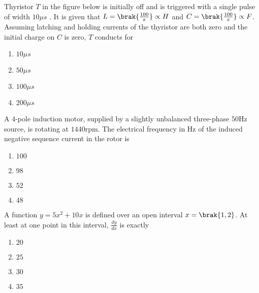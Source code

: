 \item{
Thyristor $T$ in the figure below is initially off and is triggered with a single pulse of width $10\mu s$ . It is given that $L=\brak{\frac{100}{\pi}}\propto H$ and $C=\brak{\frac{100}{\pi}}\propto F$. Assuming latching and holding currents of the thyristor are both zero and the initial charge on $C$ is zero, $T$ conducts for
\begin{figure}[H]
\centering
{}%

\label{fig:my_label}
\end{figure}
\begin{multicols}{4}
\begin{enumerate}
\item $10\mu s$
\item $50\mu s$
\item $100\mu s$
\item $200\mu s$
\end{enumerate}
\end{multicols}
}
\item{
A $4$-pole induction motor, supplied by a slightly unbalanced three-phase $50$Hz source, is rotating at $1440$rpm. The electrical frequency in Hz of the induced negative sequence current in the rotor is
\begin{multicols}{4}
\begin{enumerate}
\item $100$
\item $98$
\item $52$
\item $48$
\end{enumerate}
\end{multicols}
}
\item{
A function $y=5x^2+10x$ is defined over an open interval $x=\brak{1,2}$. At least at one point in this interval, $\frac{dy}{dx}$ is exactly
\begin{multicols}{4}
\begin{enumerate}
\item $20$
\item $25$
\item $30$
\item $35$
\end{enumerate}
\end{multicols}
}
